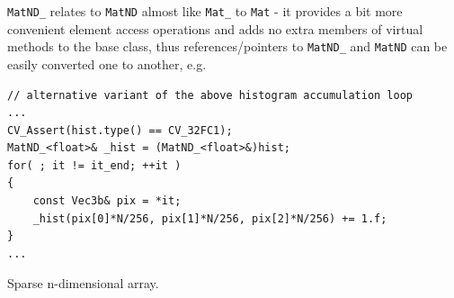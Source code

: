\texttt{MatND\_} relates to \texttt{MatND}  almost like \texttt{Mat\_} to \texttt{Mat} - it provides a bit more convenient element access operations and adds no extra members of virtual methods to the base class, thus references/pointers to \texttt{MatND\_} and \texttt{MatND} can be easily converted one to another, e.g.

\begin{lstlisting}
// alternative variant of the above histogram accumulation loop
...
CV_Assert(hist.type() == CV_32FC1);
MatND_<float>& _hist = (MatND_<float>&)hist;
for( ; it != it_end; ++it )
{
    const Vec3b& pix = *it;
    _hist(pix[0]*N/256, pix[1]*N/256, pix[2]*N/256) += 1.f;
}
...
\end{lstlisting}

\label{SparseMat}
Sparse n-dimensional array.

